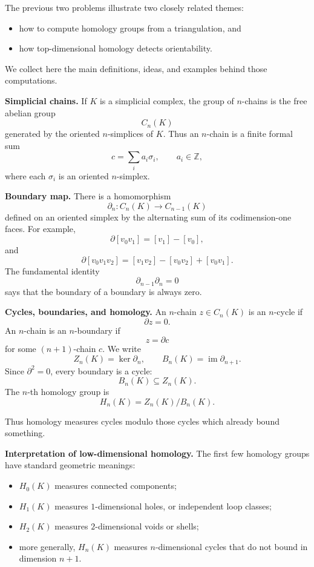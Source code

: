 \documentclass[12pt,a4paper]{article}
\theoremstyle{notespace}
\begin{document}
The previous two problems illustrate two closely related themes:

\begin{itemize}
	\item how to compute homology groups from a triangulation, and
	\item how top-dimensional homology detects orientability.
\end{itemize}

We collect here the main definitions, ideas, and examples behind those computations.

\medskip

\textbf{Simplicial chains.}
If \(K\) is a simplicial complex, the group of \(n\)-chains is the free abelian group
\[
C_n(K)
\]
generated by the oriented \(n\)-simplices of \(K\). Thus an \(n\)-chain is a finite formal sum
\[
c=\sum_i a_i\sigma_i,
\qquad a_i\in \mathbb Z,
\]
where each \(\sigma_i\) is an oriented \(n\)-simplex.

\medskip

\textbf{Boundary map.}
There is a homomorphism
\[
\partial_n:C_n(K)\to C_{n-1}(K)
\]
defined on an oriented simplex by the alternating sum of its codimension-one faces. For example,
\[
\partial[v_0v_1]=[v_1]-[v_0],
\]
and
\[
\partial[v_0v_1v_2]=[v_1v_2]-[v_0v_2]+[v_0v_1].
\]
The fundamental identity
\[
\partial_{n-1}\partial_n=0
\]
says that the boundary of a boundary is always zero.

\medskip

\textbf{Cycles, boundaries, and homology.}
An \(n\)-chain \(z\in C_n(K)\) is an \(n\)-cycle if
\[
\partial z=0.
\]
An \(n\)-chain is an \(n\)-boundary if
\[
z=\partial c
\]
for some \((n+1)\)-chain \(c\). We write
\[
Z_n(K)=\ker \partial_n,
\qquad
B_n(K)=\operatorname{im}\partial_{n+1}.
\]
Since \(\partial^2=0\), every boundary is a cycle:
\[
B_n(K)\subseteq Z_n(K).
\]
The \(n\)-th homology group is
\[
H_n(K)=Z_n(K)/B_n(K).
\]

Thus homology measures cycles modulo those cycles which already bound something.

\medskip

\textbf{Interpretation of low-dimensional homology.}
The first few homology groups have standard geometric meanings:

\begin{itemize}
	\item \(H_0(K)\) measures connected components;
	\item \(H_1(K)\) measures \(1\)-dimensional holes, or independent loop classes;
	\item \(H_2(K)\) measures \(2\)-dimensional voids or shells;
	\item more generally, \(H_n(K)\) measures \(n\)-dimensional cycles that do not bound in dimension \(n+1\).
\end{itemize}
\end{document}
